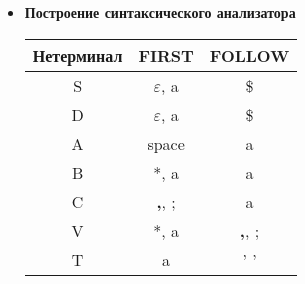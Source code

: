 \documentclass[12pt]{article}
\begin{document}
\begin{itemize}
\begin{verbatim}
			    String input;
			    int curPos;
			    Token curToken;
			    char curChar;
			    int haveType;
			
			    public LexicalAnalyzer(String input) {
			        this.input = input + "$";
			        curPos = 0;
			        nextChar();
			        haveType = 0;
			    }
			
			    void nextChar() {
			        curChar = input.charAt(curPos);
			        curPos++;
			    }
			
			    public Token curToken() {
			        return curToken;
			    }
			
			    boolean isBlank(char c) {
			        return c == ' ' || c == '\r' || c == '\n' || c == '\t';
			    }
			
			    boolean next() {
			        return curPos < input.length();
			    }
			
			    public void nextToken() throws ParseException {
			        while (next() && isBlank(curChar)) {
			            nextChar();
			        }
			        if (isBlank(curChar)) {
			            throw new ParseException("End of input string at position ", curPos);
			        }
			        if (haveType == 1) {
			            curToken = Token.SPACE;
			            haveType = 2;
			            return;
			        }
			        if (curChar == '*') {
			            curToken = Token.STAR;
			            nextChar();
			        } else if (curChar == ';') {
			            curToken = Token.SEMICOLON;
			            nextChar();
			            haveType = 0;
			        } else if (curChar == ',') {
			            curToken = Token.COMMA;
			            nextChar();
			        } else if (curChar == '$') {
			            curToken = Token.END;
			        } else {
			            String type = "" + curChar;
			            while (next() && !isBlank(curChar) && curChar != ',' && curChar != ';') {
			                nextChar();
			                type += curChar;
			            }
			            curToken = Token.NAME;
			            if (haveType == 0) {
			                haveType = 1;
			            }
			        }
			    }
			}		
		\end{verbatim}

	\item \textbf{Построение синтаксического анализатора}

		\begin{tabular} {|c|c|c|}
			\hline
				\textbf{Нетерминал} & \textbf{FIRST} & \textbf{FOLLOW} \\
			\hline
				S & $\varepsilon$,  a & \$ \\
			\hline
				D & $\varepsilon$, a & \$ \\
			\hline
				A & space & a \\
			\hline
				B & *, a & a \\
			\hline
				C & \textbf{,}, ; & a \\
			\hline
				V & *, a & \textbf{,}, ; \\
			\hline
				T & a & ' ' \\
			\hline
		\end{tabular}



\end{itemize}
\end{document}
